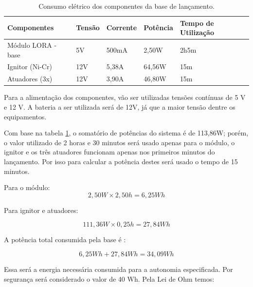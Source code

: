 \begin{center}
\begin{table}[H]
\centering
\begin{tabular}{ |m{4cm}|m{2cm}|m{2cm}|m{2cm}|m{3cm}|} 
\hline
\textbf{ Componentes }&\textbf{ Tensão} & \textbf{Corrente }& \textbf{Potência} & \textbf{Tempo de Utilização}\\ 
 \hline
 Módulo LORA - base & 5V & 500mA & 2,50W & 2h5m\\ 
 \hline
 Ignitor (Ni-Cr) & 12V & 5,38A & 64,56W & 15m \\
 \hline
 Atuadores (3x) & 12V & 3,90A & 46,80W & 15m \\ 
 \hline
\end{tabular}
\caption{Consumo elétrico dos componentes da base de lançamento.}
\label{tab:consumo2}
\end{table}
\end{center}

\par Para a alimentação dos componentes, vão ser utilizadas tensões contínuas de 5 V e 12 V. A bateria a ser utilizada será de 12V, já que a maior tensão dentre os equipamentos.

\par Com base na tabela \ref{tab:consumo2}, o somatório de potências do sistema é de 113,86W; porém, o valor utilizado de 2 horas e 30 minutos será usado apenas para o módulo, o ignitor e os três atuadores funcionam apenas nos primeiros minutos do lançamento. Por isso para calcular a potência destes será usado o tempo de 15 minutos.

\par Para o módulo:
\begin{equation}
    2,50W \times 2,50h = 6,25 Wh
\end{equation}

\par Para ignitor e atuadores:

\begin{equation}
    111,36W \times 0,25h = 27,84 Wh
\end{equation}

\par A potência total consumida pela base é :

\begin{equation}
    6,25Wh + 27,84Wh = 34,09 Wh
\end{equation}

\par Essa será a energia necessária consumida para a autonomia especificada. Por segurança será considerado o valor de 40 Wh.
Pela Lei de Ohm temos:


